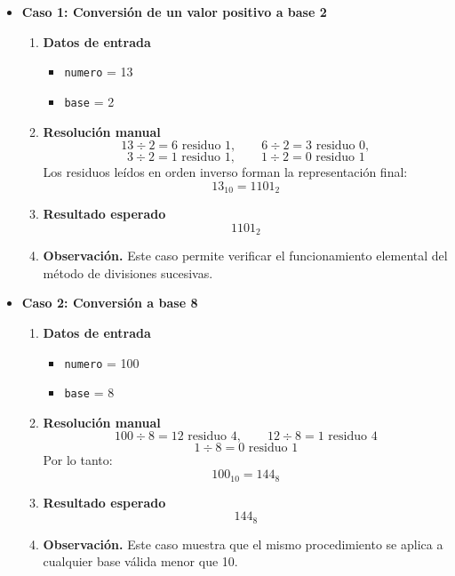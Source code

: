 \documentclass[12pt,twoside]{book}
\begin{document}
					\begin{itemize}
						
						\item \textbf{Caso 1: Conversión de un valor positivo a base 2}
						\begin{enumerate}
							\item \textbf{Datos de entrada}
							\begin{itemize}
								\item \texttt{numero} = 13
								\item \texttt{base} = 2
							\end{itemize}
							\item \textbf{Resolución manual}
							\[
							13 \div 2 = 6 \text{ residuo } 1,\qquad
							6 \div 2 = 3 \text{ residuo } 0,
							\]
							\[
							3 \div 2 = 1 \text{ residuo } 1,\qquad
							1 \div 2 = 0 \text{ residuo } 1
							\]
							Los residuos leídos en orden inverso forman la representación final:
							\[
							13_{10}=1101_2
							\]
							\item \textbf{Resultado esperado}
							\[
							1101_2
							\]
							\item \textbf{Observación.} Este caso permite verificar el funcionamiento elemental del método de divisiones sucesivas.
						\end{enumerate}
						
						
						\item \textbf{Caso 2: Conversión a base 8}
						\begin{enumerate}
							\item \textbf{Datos de entrada}
							\begin{itemize}
								\item \texttt{numero} = 100
								\item \texttt{base} = 8
							\end{itemize}
							\item \textbf{Resolución manual}
							\[
							100 \div 8 = 12 \text{ residuo } 4,\qquad
							12 \div 8 = 1 \text{ residuo } 4
							\]
							\[
							1 \div 8 = 0 \text{ residuo } 1
							\]
							Por lo tanto:
							\[
							100_{10}=144_8
							\]
							\item \textbf{Resultado esperado}
							\[
							144_8
							\]
							\item \textbf{Observación.} Este caso muestra que el mismo procedimiento se aplica a cualquier base válida menor que 10.
						\end{enumerate}
						

\end{itemize}
\end{document}
